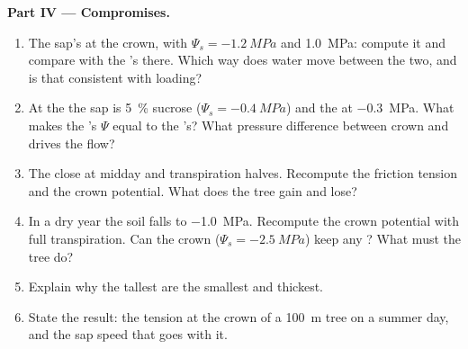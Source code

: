 \begin{problem}
\medskip
\noindent\textbf{Part IV --- Compromises.}
\begin{enumerate}[resume]
  \item The  sap's  at the crown, with
        $\Psi_s = \qty{-1.2}{MPa}$ and  \qty{1.0}{MPa}: compute it
        and compare with the 's there. Which way does water move
        between the two, and is that consistent with loading?
  \item At the  the  sap is \qty{5}{\%} sucrose ($\Psi_s =
        \qty{-0.4}{MPa}$) and the  at \qty{-0.3}{MPa}. What 
        makes the 's $\Psi$ equal to the 's? What pressure
        difference between crown and  drives the flow?
  \item The  close at midday and transpiration halves.
        Recompute the friction tension and the crown  potential.
        What does the tree gain and lose?
  \item In a dry year the soil falls to \qty{-1.0}{MPa}. Recompute the
        crown potential with full transpiration. Can the crown 
        ($\Psi_s = \qty{-2.5}{MPa}$) keep any ? What must the
        tree do?
  \item Explain why the tallest  are the smallest and thickest.
  \item State the result: the  tension at the crown of a
        \qty{100}{m} tree on a summer day, and the sap speed that goes
        with it.
\end{enumerate}
\end{problem}

